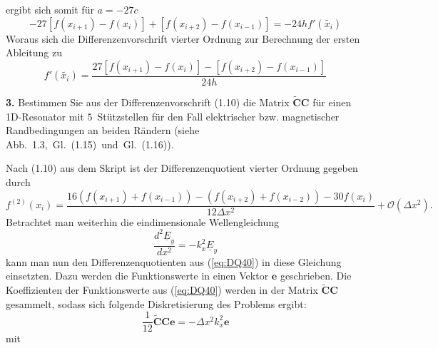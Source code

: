 \documentclass[Protokollheft.tex]{subfiles}
\begin{document}
	ergibt sich somit für $a = -27c$ 
	\begin{equation*}
		-27[f(x_{i+1})-f(x_i)]+[f(x_{i+2})-f(x_{i-1})] = -24 hf'(\tilde{x_i})
	\end{equation*}
	Woraus sich die Differenzenvorschrift vierter Ordnung zur Berechnung der ersten Ableitung zu 
	\begin{equation}
	\label{eq:DifVorOrd4}
	f'(\tilde{x_i}) = \frac{27[f(x_{i+1})-f(x_i)]-[f(x_{i+2})-f(x_{i-1})]}{24h}
	\end{equation}
	
	\begin{framed}
		\noindent \textbf{3.} Bestimmen Sie aus der Differenzenvorschrift (1.10) die Matrix $\tilde{\textbf{C}}\textbf{C}$ für einen 1D-Resonator mit $5$~Stützstellen für den Fall elektrischer bzw. magnetischer Randbedingungen an beiden Rändern (siehe Abb.~1.3,~Gl.~(1.15)~und~Gl.~(1.16)).\label{exer:matrixCC}
	\end{framed}
	\noindent
	Nach (1.10) aus dem Skript ist der Differenzenquotient vierter Ordnung gegeben durch
	\begin{equation}
	\label{eq:DQ40}
	f^{(2)}(x_i)=\frac{16(f(x_{i+1})+f(x_{i-1}))-(f(x_{i+2})+f(x_{i-2}))-30f(x_i)}{12\Delta x^2}+\mathcal{O}(\Delta x^2).
	\end{equation}
	Betrachtet man weiterhin die eindimensionale Wellengleichung
	\begin{equation*}
		\frac{d^2\underline{E}_y}{dx^2}=-k^2_x\underline{E}_y
	\end{equation*}
	kann man nun den Differenzenquotienten aus (\ref{eq:DQ40}) in diese Gleichung einsetzten. Dazu werden die Funktionswerte in einen Vektor $\mathbf{e}$ geschrieben. Die Koeffizienten der Funktionswerte aus (\ref{eq:DQ40}) werden in der Matrix $\mathbf{\widetilde{C}C}$ gesammelt, sodass sich folgende Diskretisierung des Problems ergibt:
	\begin{equation}
	\label{eq:cc}
	\frac{1}{12}\mathbf{\widetilde{C}Ce}=-\Delta x^2k^2_x\mathbf{e}
	\end{equation}
	mit
\end{document}
